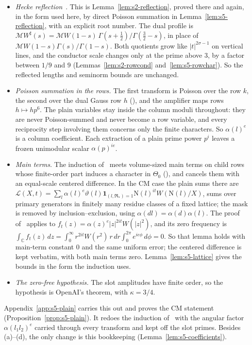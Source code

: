 \documentclass[11pt]{article}
\numberwithin{equation}{section}
\newcommand{\N}{\mathrm N}
\newcommand{\ind}{\mathbf1}
\begin{document}
\begin{itemize}
\item[(a)] \emph{Hecke reflection}~\cite{Hec20}. This is Lemma~\ref{lem:s2-reflection}, proved there and again, in the form
 used here, by direct Poisson summation in Lemma~\ref{lem:s5-reflection}, with an explicit root number. The dual
 profile is
 $\mathcal MW^\sharp(s)=\mathcal MW(1-s)\,\Gamma(s+\frac12)/\Gamma(\frac32-s)$, in place of
 $\mathcal MW(1-s)\Gamma(s)/\Gamma(1-s)$. Both quotients grow like $|t|^{2\sigma-1}$ on vertical lines,
 and the conductor scale changes only at the prime above $3$, by a factor between $1/9$ and $9$
 (Lemmas~\ref{lem:s2-rowcond} and~\ref{lem:s5-rowchar}). So the reflected lengths and seminorm bounds are
 unchanged.
\item[(b)] \emph{Poisson summation in the rows.} The first transform is Poisson over the row $k$, the second over
 the dual Gauss row $h$ (\cite[Lemma~13.3]{OAI78}), and the amplifier maps rows $h\mapsto hp^6$.
 The plain variables stay inside the column moduli throughout: they are never Poisson-summed and never become a
 row variable, and every reciprocity step involving them concerns only the finite characters. So $\alpha(l)^e$ is
 a column coefficient. Each extraction of a plain prime power $p^i$ leaves a frozen unimodular scalar
 $\alpha(p)^{ie}$.
\item[(c)] \emph{Main terms.} The induction of~\cite{OAI78} meets volume-sized main terms on child rows whose
 finite-order part induces a character in $\Theta_0$ (\cite[Section~18.7]{OAI78}), and cancels them with an
 equal-scale centered difference. In the CM case the plain sums there are
 $\mathcal L(X,t)=\sum_l\alpha(l)^e\vartheta(l)\ind_{(l,\mathfrak R_*)=1}\N(l)^{it}W(\N(l)/X)$, sums over primary
 generators in finitely many residue classes of a fixed lattice; the mask is removed by inclusion--exclusion,
 using $\alpha(dl)=\alpha(d)\alpha(l)$. The proof of~\cite[Lemma~18.3]{OAI78} applies to
 $f_t(z)=\alpha(z)^e|z|^{2it}W(|z|^2)$, and its zero frequency is
 $\int_{\mathbb C}f_t(z)\,dz=\int_0^\infty r^{2it}W(r^2)\,r\,dr\int_0^{2\pi}e^{ie\phi}\,d\phi=0$. So that lemma holds
 with main-term constant $0$ and the same uniform error; the centered difference is kept verbatim, with both main
 terms zero. Lemma~\ref{lem:s5-lattice} gives the bounds in the form the induction uses.
\item[(d)] \emph{The zero-free hypothesis.} The slot amplitudes have finite order, so the hypothesis
 is OpenAI's theorem, with $\kappa=3/4$.
\end{itemize}
Appendix~\ref{app:s5-plain} carries this out and proves the CM statement
(Proposition~\ref{prop:s5-plain}). It redoes the induction of~\cite{OAI78} with the angular factor
$\alpha(l_1l_2)^e$ carried through every transform and kept off the slot primes. Besides (a)--(d), the only
change is this bookkeeping (Lemma~\ref{lem:s5-coefficients}).
\end{document}
